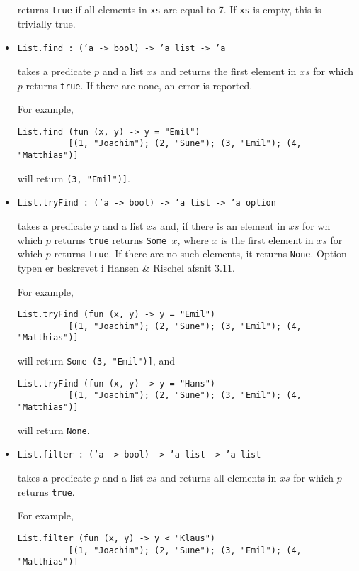\documentclass[a4paper]{article}
\begin{document}
\begin{itemize}
returns \texttt{true} if all elements in \texttt{xs} are equal to 7.
If \texttt{xs} is empty, this is trivially true.

\item \texttt{List.find : ('a -> bool) -> 'a list -> 'a}

takes a predicate $p$ and a list $xs$ and returns the first
element in $xs$ for which $p$ returns \texttt{true}. If there are
none, an error is reported.

For example,

\begin{verbatim}
List.find (fun (x, y) -> y = "Emil")
          [(1, "Joachim"); (2, "Sune"); (3, "Emil"); (4, "Matthias")]
\end{verbatim}

will return \texttt{(3, "Emil")]}.

\item \texttt{List.tryFind : ('a -> bool) -> 'a list -> 'a option}

takes a predicate $p$ and a list $xs$ and, if there is an element in
$xs$ for wh which $p$ returns \texttt{true} returns \texttt{Some $x$},
where $x$ is the first element in $xs$ for which $p$ returns
\texttt{true}. If there are no such elements, it returns
\texttt{None}.  Option-typen er beskrevet i Hansen \& Rischel afsnit
3.11.

For example,

\begin{verbatim}
List.tryFind (fun (x, y) -> y = "Emil")
          [(1, "Joachim"); (2, "Sune"); (3, "Emil"); (4, "Matthias")]
\end{verbatim}

will return \texttt{Some (3, "Emil")]}, and 

\begin{verbatim}
List.tryFind (fun (x, y) -> y = "Hans")
          [(1, "Joachim"); (2, "Sune"); (3, "Emil"); (4, "Matthias")]
\end{verbatim}

will return \texttt{None}.

\item \texttt{List.filter : ('a -> bool) -> 'a list -> 'a list}

takes a predicate $p$ and a list $xs$ and returns all
elements in $xs$ for which $p$ returns \texttt{true}.

For example,

\begin{verbatim}
List.filter (fun (x, y) -> y < "Klaus")
          [(1, "Joachim"); (2, "Sune"); (3, "Emil"); (4, "Matthias")]
\end{verbatim}


\end{itemize}
\end{document}
